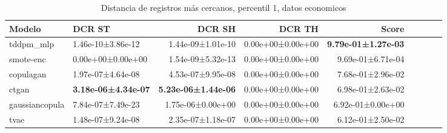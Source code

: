 \begin{table}[H]
\centering
\fontsize{10}{14}\selectfont
\caption{Distancia de registros más cercanos, percentil 1, datos economicos}
\label{table-dcr-economicos-a-1th}
\begin{tabular}{|l|l|r|r|r|r|r|r|r|}
\hline
\rowcolor[gray]{0.8}
Modelo & DCR ST & DCR SH & DCR TH & \textbf{Score} \\
\hline tddpm\_mlp & 1.46e-10±3.86e-12 & \cellcolor[rgb]{0.9, 0.54, 0.52} 1.44e-09±1.01e-10 & 0.00e+00±0.00e+00 & \bfseries 9.79e-01±1.27e-03 \\
\hline smote-enc & \cellcolor[rgb]{0.9, 0.54, 0.52} 0.00e+00±0.00e+00 & 1.54e-09±5.32e-13 & 0.00e+00±0.00e+00 & 9.69e-01±6.71e-04 \\
\hline copulagan & 1.97e-07±4.64e-08 & 4.53e-07±9.95e-08 & 0.00e+00±0.00e+00 & 7.68e-01±2.96e-02 \\
\hline ctgan & \bfseries 3.18e-06±4.34e-07 & \bfseries 5.23e-06±1.44e-06 & 0.00e+00±0.00e+00 & 6.98e-01±2.63e-02 \\
\hline gaussiancopula & 7.84e-07±7.49e-23 & 1.75e-06±0.00e+00 & 0.00e+00±0.00e+00 & 6.92e-01±0.00e+00 \\
\hline tvae & 1.48e-07±9.24e-08 & 2.35e-07±1.18e-07 & 0.00e+00±0.00e+00 & \cellcolor[rgb]{0.9, 0.54, 0.52} 6.12e-01±2.50e-02 \\
\hline
\end{tabular}
\end{table}
